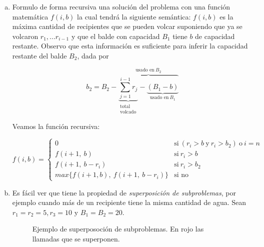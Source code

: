 \documentclass[12pt, a4paper]{report}
\theoremstyle{definition} %
\begin{document}
\begin{enumerate}[a)]
    \item Formulo de forma recursiva una solución del problema con una función matemática $f(i, b)$ la cual tendrá la siguiente semántica: $f(i, b)$ es la máxima cantidad de recipientes que se pueden volcar suponiendo que ya se volcaron $r_1, ... r_{i-1}$ y que el balde con capacidad $B_1$ tiene $b$ de capacidad restante. Observo que esta información es suficiente para inferir la capacidad restante del balde $B_2$, dada por 
    
    \[ 
        b_2 = B_2 -
            \overbrace{
            \underbrace{\sum_{j=1}^{i-1} r_j}_{\substack{\text{total}\\\text{volcado}}} - 
            \underbrace{(B_1 - b)}_{\text{usado en} \ B_1}
            }^{\text{usado en} \ B_2}
    \]

    Veamos la función recursiva:

    \[ 
        f(i, b) =
            \begin{cases}
                0 & \text{si} \ (r_i > b \ \text{y}\  r_i > b_2) \ \text{o} \ i = n \\
                f(i+1,\ b) &\text{si}\ r_i > b\\
                f(i+1,\ b - r_i) &\text{si}\ r_i > b_2\\
                max\{f(i+1, b),\ f(i+1,\ b - r_i)\} &\text{si no}
            \end{cases}
    \]

    \item Es fácil ver que tiene la propiedad de \textit{superposición de subproblemas}, por ejemplo cuando más de un recipiente tiene la misma cantidad de agua. Sean $r_1 = r_2 = 5, r_3 = 10$ y $B_1 = B_2 = 20$.
    
    \begin{figure}[H]
        \centering
        \caption{Ejemplo de superposoción de subproblemas. En rojo las llamadas que se superponen.}
    \end{figure}


\end{enumerate}
\end{document}
